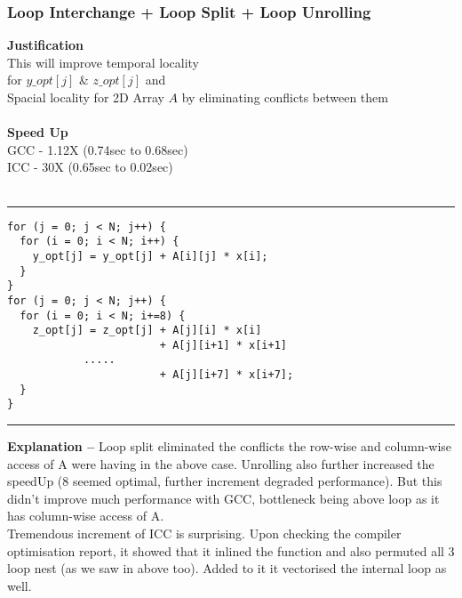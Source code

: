 \documentclass[a4paper]{article}
\begin{document}
\subsubsection{\large\bf Loop Interchange + Loop Split + Loop Unrolling}
\begin{minipage}{0.4\textwidth}
{\bf Justification} \\
This will improve temporal locality  \\ for $y\_opt[j]$ \& $z\_opt[j]$  and \\
Spacial locality for 2D Array $A$ by eliminating conflicts between them\\ \\
{\bf Speed Up} \\
GCC - 1.12X (0.74sec to 0.68sec)\\ 
ICC - 30X (0.65sec to 0.02sec)\\ \\
\end{minipage}
\begin{minipage}{0.6\textwidth}
\hrule
\begin{lstlisting}
for (j = 0; j < N; j++) {
  for (i = 0; i < N; i++) {
    y_opt[j] = y_opt[j] + A[i][j] * x[i];
  }
}
for (j = 0; j < N; j++) {
  for (i = 0; i < N; i+=8) {
    z_opt[j] = z_opt[j] + A[j][i] * x[i]
                        + A[j][i+1] * x[i+1]
			.....
                        + A[j][i+7] * x[i+7];
  }
}
\end{lstlisting}
\hrule 
\end{minipage}
\vspace{0.2cm}
\newline
{\bf Explanation -- } Loop split eliminated the conflicts the row-wise and column-wise access of A were having in the above case. Unrolling also further increased the speedUp (8 seemed optimal, further increment degraded performance). But this didn't improve much performance with GCC, bottleneck being above loop as it has column-wise access of A. \\
Tremendous increment of ICC is surprising. Upon checking the compiler optimisation report, it showed that it inlined the function and also permuted all 3 loop nest (as we saw in above too). Added to it it vectorised the internal loop as well. 
\end{document}
